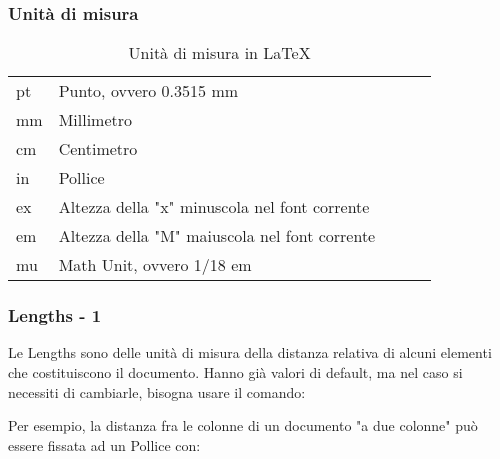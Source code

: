 \begin{frame}[fragile]
\frametitle{Unit\`a di misura}

\begin{table}[]
\caption{Unit\`a di misura in \LaTeX}
\begin{tabular}{l|llll}
\cline{1-2}
pt & Punto, ovvero 0.3515 mm  \\ \cline{1-2}
mm &  Millimetro  \\ \cline{1-2}
cm &  Centimetro  \\ \cline{1-2}
in &  Pollice  \\ \cline{1-2}
ex &  Altezza della "x" minuscola nel font corrente \\ \cline{1-2}
em &  Altezza della "M" maiuscola nel font corrente \\ \cline{1-2}
mu &  Math Unit, ovvero 1/18 em  \\ \cline{1-2}
\end{tabular}
\end{table}

\end{frame}


\begin{frame}[fragile]
\frametitle{Lengths - 1}

Le Lengths sono delle unit\`a di misura della distanza relativa di alcuni elementi che costituiscono il documento. Hanno gi\`a valori di default, ma nel caso si necessiti di cambiarle, bisogna usare il comando:\newline

\texttt{\setlength{\lengthname}{value_in_specified_unit}}\newline

Per esempio, la distanza fra le colonne di un documento "a due colonne" pu\`o essere fissata ad un Pollice con:\newline

\texttt{\setlength{\columnsep}{1in}}

\end{frame}

